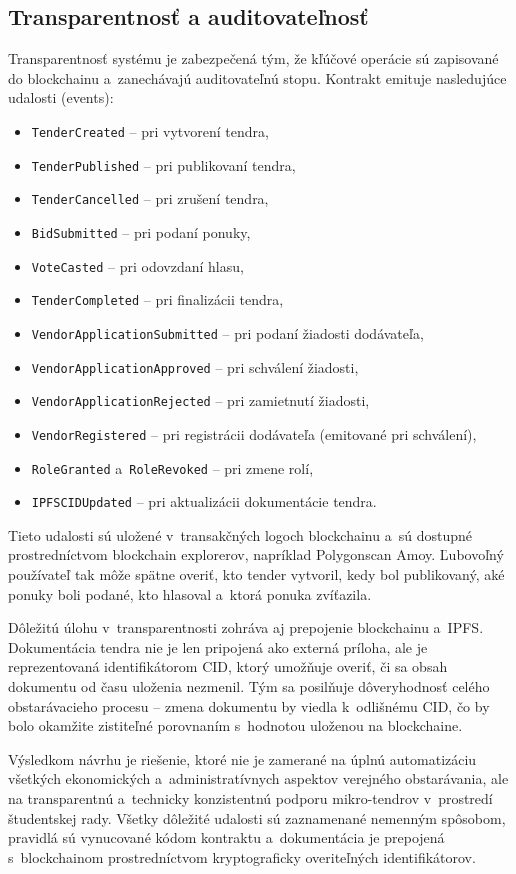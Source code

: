 \subsection{Transparentnosť a auditovateľnosť}
\label{subsec:transparency}

Transparentnosť systému je zabezpečená tým, že kľúčové operácie sú
zapisované do blockchainu a~zanechávajú auditovateľnú stopu. Kontrakt
emituje nasledujúce udalosti (events):
\begin{itemize}
    \item \texttt{TenderCreated} -- pri vytvorení tendra,
    \item \texttt{TenderPublished} -- pri publikovaní tendra,
    \item \texttt{TenderCancelled} -- pri zrušení tendra,
    \item \texttt{BidSubmitted} -- pri podaní ponuky,
    \item \texttt{VoteCasted} -- pri odovzdaní hlasu,
    \item \texttt{TenderCompleted} -- pri finalizácii tendra,
    \item \texttt{VendorApplicationSubmitted} -- pri podaní žiadosti
    dodávateľa,
    \item \texttt{VendorApplicationApproved} -- pri schválení žiadosti,
    \item \texttt{VendorApplicationRejected} -- pri zamietnutí žiadosti,
    \item \texttt{VendorRegistered} -- pri registrácii dodávateľa (emitované pri schválení),
    \item \texttt{RoleGranted} a~\texttt{RoleRevoked} -- pri zmene rolí,
    \item \texttt{IPFSCIDUpdated} -- pri aktualizácii dokumentácie tendra.
\end{itemize}

Tieto udalosti sú uložené v~transakčných logoch blockchainu a~sú
dostupné prostredníctvom blockchain explorerov, napríklad Polygonscan
Amoy. Ľubovoľný používateľ tak môže spätne overiť, kto tender vytvoril,
kedy bol publikovaný, aké ponuky boli podané, kto hlasoval a~ktorá
ponuka zvíťazila.

Dôležitú úlohu v~transparentnosti zohráva aj prepojenie blockchainu
a~IPFS. Dokumentácia tendra nie je len pripojená ako externá príloha,
ale je reprezentovaná identifikátorom CID, ktorý umožňuje overiť, či
sa obsah dokumentu od času uloženia nezmenil. Tým sa posilňuje
dôveryhodnosť celého obstarávacieho procesu -- zmena dokumentu by viedla
k~odlišnému CID, čo by bolo okamžite zistiteľné porovnaním s~hodnotou
uloženou na blockchaine.

Výsledkom návrhu je riešenie, ktoré nie je zamerané na úplnú automatizáciu
všetkých ekonomických a~administratívnych aspektov verejného obstarávania,
ale na transparentnú a~technicky konzistentnú podporu mikro-tendrov
v~prostredí študentskej rady. Všetky dôležité udalosti sú zaznamenané
nemenným spôsobom, pravidlá sú vynucované kódom kontraktu a~dokumentácia
je prepojená s~blockchainom prostredníctvom kryptograficky overiteľných
identifikátorov.
